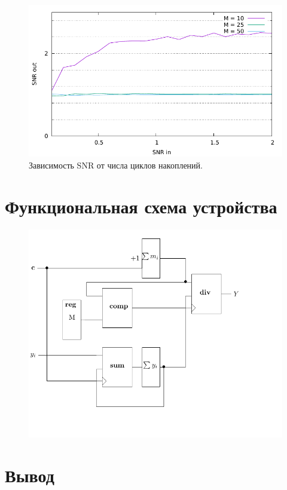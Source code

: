 \documentclass[12pt, a4paper] {ncc}
\begin{document}
        \begin{figure}[H]
            \centering
            \includegraphics[scale=0.9,page=1]{nonstat_by_snr.pdf}
            \caption{Зависимость SNR от числа циклов накоплений.}
        \end{figure}

\section*{Функциональная схема устройства}
        \begin{figure}[H]
            \centering
            \includegraphics[scale=0.9,page=1]{ffbd.pdf}
        \end{figure}

\section*{Вывод}
\end{document}
